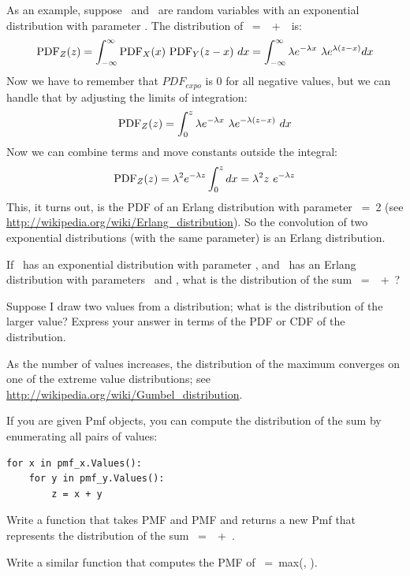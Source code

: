 \documentclass[12pt]{book}
\begin{document}
As an example, suppose \X~and \Y~are random variables with an
exponential distribution with parameter \mylambda.  
The distribution of \Z~=~\X~+~\Y~is:
%
\[ \mathrm{PDF}_Z(z) = \int_{-\infty}^{\infty} \mathrm{PDF}_X(x)~\mathrm{PDF}_Y(z-x) ~ dx = 
\int_{-\infty}^{\infty} \lambda e^{-\lambda x}~\lambda e^{\lambda (z-x)} dx \]
%
Now we have to remember that $PDF_{expo}$ is 0 for all negative
values, but we can handle that by adjusting the limits of integration:
%
\[ \mathrm{PDF}_Z(z) = \int_{0}^{z} \lambda e^{-\lambda x}~\lambda e^{-\lambda (z-x)} ~ dx \]
%
Now we can combine terms and move constants outside the integral:
%
\[ \mathrm{PDF}_Z(z) = \lambda^2 e^{-\lambda z} \int_{0}^{z} dx = 
\lambda^2 z ~ e^{-\lambda z} \]
% 
This, it turns out, is the PDF of an Erlang distribution with
parameter \kk~=~2 (see \url{http://wikipedia.org/wiki/Erlang_distribution}).
So the convolution of two exponential distributions (with the same
parameter) is an Erlang distribution.

\begin{exercise}
If \X~has an exponential distribution with parameter
\mylambda, and \Y~has an Erlang distribution with parameters
\kk~and \mylambda, what is the distribution of the sum \Z~=~\X~+~\Y?

\end{exercise}

\begin{exercise}
Suppose I draw two values from a distribution; what is the distribution
of the larger value?  Express your answer in terms of the PDF or CDF of
the distribution.

As the number of values increases, the distribution of the maximum
converges on one of the extreme value distributions; see
\url{http://wikipedia.org/wiki/Gumbel_distribution}.

\end{exercise}

\begin{exercise}
If you are given Pmf objects, you can compute the distribution of
the sum by enumerating all pairs of values:
%
\begin{verbatim}
for x in pmf_x.Values():
    for y in pmf_y.Values():
        z = x + y
\end{verbatim}

Write a function that takes PMF and
PMF and returns a new Pmf that represents the distribution of
the sum \Z~=~\X~+~\Y.

Write a similar function that computes the PMF of \Z~=~max(\X, \Y).

\end{exercise}
\end{document}
